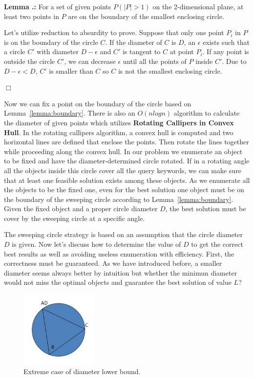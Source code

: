 \documentclass{sig-alternate}
\newcounter{theorem}[section]
\renewcommand{\thetheorem}{\nthesection.\arabic{theorem}}
\newenvironment{lemma}{\begin{em}
    \refstepcounter{theorem}
    {\vspace{1ex} \noindent\bf  Lemma  \thetheorem:}}{
    \end{em}\eop\vspace{1ex}} %
\newcommand{\nthesection}{\arabic{section}}
\newcommand{\eop}{\hspace*{\fill}\mbox{$\Box$}}
\begin{document}
\begin{lemma}\label{lemma:boundary}
For a set of given points $P(|P|>1)$ on the 2-dimensional plane,
at least two points in $P$ are on the boundary of the smallest enclosing circle.

\proof
Let's utilize reduction to absurdity to prove. Suppose that only one point 
$P_i$ in $P$ is on the boundary of the circle $C$. If the diameter of $C$
is $D$, an $\epsilon$ exists such that a circle $C'$ with diameter $D-\epsilon$
and $C'$ is tangent to $C$ at point $P_i$. If any point is outside the
circle $C'$, we can decrease $\epsilon$ until all the points of $P$ inside
$C'$. Due to $D-\epsilon < D$, $C'$ is smaller than $C$ so $C$ is not
the smallest enclosing circle.
\end{lemma}

Now we can fix a point on the boundary of the circle based on Lemma~\ref{lemma:boundary}.
There is also an $O(nlogn)$ algorithm to calculate the diameter of given points 
which utilizes \textbf{Rotating Callipers in Convex Hull}. In the rotating callipers
algorithm, a convex hull is computed and two horizontal lines are defined
that enclose the points. Then rotate the lines together while proceeding along the
convex hull. In our problem we enumerate an object to be fixed and have the
diameter-determined circle rotated. If in a rotating angle all the objects inside
this circle cover all the query keywords, we can make sure that at least one feasible solution
exists among these objects. As we enumerate all the objects to be the fixed
one, even for the best solution one object must be on the boundary of the sweeping circle
according to Lemma~\ref{lemma:boundary}. Given the fixed object and a proper circle diameter $D$,
the best solution must be cover by the sweeping circle at a specific angle.\par
%
The sweeping circle strategy is based on an assumption that the circle diameter $D$
is given. Now let's discuss how to determine the value of $D$ to get the
correct best results as well as avoiding useless enumeration with efficiency.
First, the correctness must be guaranteed. As we have introduced before, a smaller
diameter seems always better by intuition but whether the minimun diameter would 
not miss the optimal objects and guarantee the best solution of value $L$?\par
%
\begin{figure}\label{fig:2}
\begin{minipage}[t]{0.5\linewidth}
\centering
\includegraphics[width=1.5in]{figure/fig2}
\caption{Extreme case of diameter lower bound.}
\end{minipage}
\end{figure}
\end{document}
